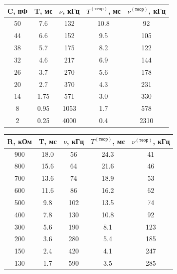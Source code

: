 \documentclass[14pt, a4paper,reqno]{article}
\begin{document}
    \begin{center}
        \begin{tabular}{|c|c|c|c|c|}
            \hline
            C, нФ & T, мс & $\nu$, кГц & $T^{(теор)}$, мс & $\nu^{(теор)}$, кГц \\ \hline
            \hline
            50    & 7.6   &  132       & 10.8 & 92   \\ \hline
            44    & 6.6   &  152       & 9.5  & 105  \\ \hline
            38    & 5.7   &  175       & 8.2  & 122  \\ \hline
            32    & 4.6   &  217       & 6.9  & 144  \\ \hline
            26    & 3.7   &  270       & 5.6  & 178  \\ \hline
            20    & 2.7   &  370       & 4.3  & 231  \\ \hline
            14    & 1.75  &  571       & 3.0  & 330  \\ \hline
            8     & 0.95  &  1053      & 1.7  & 578  \\ \hline
            2     & 0.25  &  4000      & 0.4  & 2310 \\ \hline
        \end{tabular}
    \end{center}

    \begin{center}
        \begin{tabular}{|c|c|c|c|c|}
            \hline
            R, кОм & T, мс & $\nu$, кГц & $T^{(теор)}$, мс & $\nu^{(теор)}$, кГц    \\ \hline
            \hline
            900    & 18.0  & 56         & 24.3  & 41  \\ \hline
            800    & 15.6  & 64         & 21.6  & 46  \\ \hline
            700    & 13.6  & 74         & 18.9  & 53  \\ \hline
            600    & 11.6  & 86         & 16.2  & 62  \\ \hline
            500    & 9.8   & 102        & 13.5  & 74  \\ \hline
            400    & 7.8   & 130        & 10.8  & 92  \\ \hline
            300    & 5.6   & 190        &  8.1  & 123 \\ \hline
            200    & 3.6   & 280        &  5.4  & 185 \\ \hline
            150    & 2.4   & 420        &  4.1  & 247 \\ \hline
            130    & 1.7   & 590        &  3.5  & 285 \\ \hline       
        \end{tabular}
    \end{center}
\end{document}

